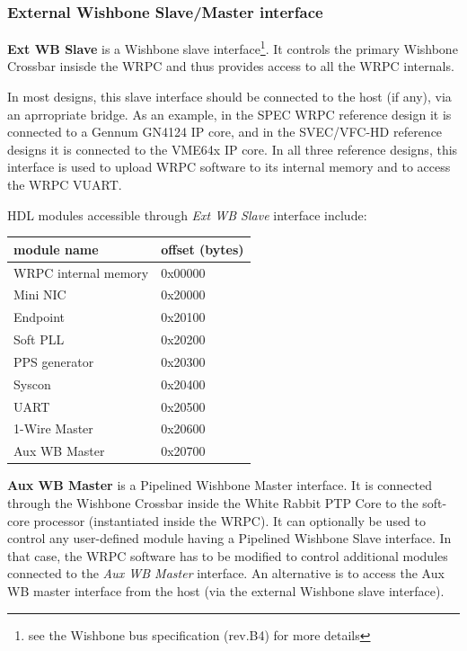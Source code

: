 \subsubsection{External Wishbone Slave/Master interface}
\label{sec:wrpc_wb}

{\bf Ext WB Slave} is a Wishbone slave interface\footnote{see the Wishbone bus specification (rev.B4)
for more details}. It controls the primary Wishbone Crossbar insisde the WRPC and thus provides
access to all the WRPC internals.

In most designs, this slave interface should be connected to the host (if any), via an aprropriate
bridge. As an example, in the SPEC WRPC reference design it is connected to a Gennum GN4124 IP core,
and in the SVEC/VFC-HD reference designs it is connected to the VME64x IP core.  In all three
reference designs, this interface is used to upload WRPC software to its internal memory and to
access the WRPC VUART.

HDL modules accessible through \emph{Ext WB Slave} interface include:
\begin{center}
  \begin{tabular}{|l|l|}
    \hline {\bf module name} & {\bf offset (bytes)}\\
    \hline
    WRPC internal memory & 0x00000\\
                Mini NIC & 0x20000\\
                Endpoint & 0x20100\\
                Soft PLL & 0x20200\\
           PPS generator & 0x20300\\
                  Syscon & 0x20400\\
                    UART & 0x20500\\
           1-Wire Master & 0x20600\\
           Aux WB Master & 0x20700\\
    \hline
  \end{tabular}
\end{center}

{\bf Aux WB Master} is a Pipelined Wishbone Master interface. It is connected through the Wishbone
Crossbar inside the White Rabbit PTP Core to the soft-core processor (instantiated inside the
WRPC). It can optionally be used to control any user-defined module having a Pipelined Wishbone
Slave interface. In that case, the WRPC software has to be modified to control additional modules
connected to the \emph{Aux WB Master} interface. An alternative is to access the Aux WB master
interface from the host (via the external Wishbone slave interface).

